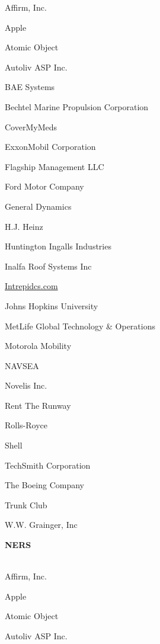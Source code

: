 \documentclass[twoside]{article}
\begin{document}
\begin{center}
\begin{multicols}{5}
\begin{FlushLeft}
        \begin{compactitem}
        \item Affirm, Inc.
\item Apple
\item Atomic Object
\item Autoliv ASP Inc.
\item BAE Systems
\item Bechtel Marine Propulsion Corporation
\item CoverMyMeds
\item ExxonMobil Corporation
\item Flagship Management LLC
\item Ford Motor Company
\item General Dynamics
\item H.J. Heinz
\item Huntington Ingalls Industries
\item Inalfa Roof Systems Inc
\item \url{Intrepidcs.com}
\item Johns Hopkins University
\item MetLife Global Technology \& Operations
\item Motorola Mobility
\item NAVSEA
\item Novelis Inc.
\item Rent The Runway
\item Rolls-Royce
\item Shell
\item TechSmith Corporation
\item The Boeing Company
\item Trunk Club
\item W.W. Grainger, Inc
\end{compactitem}
        \end{FlushLeft}
        \vspace{1em}
        {\fontsize{14}{16}\selectfont \bf NERS}\\
        \vspace{-1em}
        ~\hrulefill~
        \vspace{-.9em}
        \begin{FlushLeft}
        \begin{compactitem}
        \item Affirm, Inc.
\item Apple
\item Atomic Object
\item Autoliv ASP Inc.

\end{compactitem}
\end{FlushLeft}
\end{multicols}
\end{center}
\end{document}
